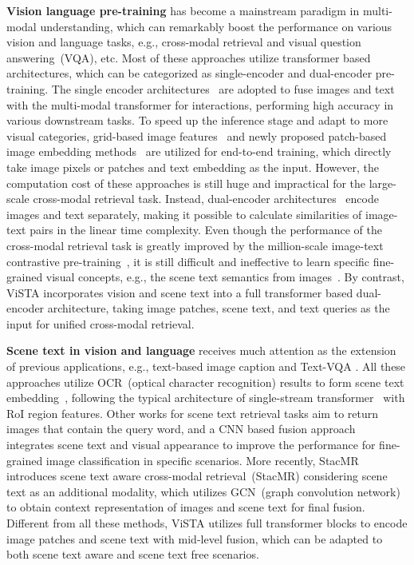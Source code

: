 \documentclass[10pt,twocolumn,letterpaper]{article}
\begin{document}
\noindent \textbf{Vision language pre-training}
has become a mainstream paradigm in multi-modal understanding, which can remarkably boost the performance on various vision and language tasks, e.g., cross-modal retrieval and visual question answering~(VQA), etc. Most of these approaches utilize transformer based architectures, which can be categorized as single-encoder and dual-encoder pre-training. The single encoder architectures~\cite{vilbert, vl-betr, imagebert, tan2019lxmert, unicoder, UNITER, oscar, ERNIE-ViL, vinvl, Pixel-BERT, SOHO, ViLT, xue2021probing} are adopted to fuse images and text with the multi-modal transformer for interactions, performing high accuracy in various downstream tasks. To speed up the inference stage and adapt to more visual categories, grid-based image features~\cite{Pixel-BERT, SOHO} and newly proposed patch-based image embedding methods~\cite{ViLT, xue2021probing, albef} are utilized for end-to-end training, which directly take image pixels or patches and text embedding as the input. However, the computation cost of these approaches is still huge and impractical for the large-scale cross-modal retrieval task. Instead, dual-encoder architectures~\cite{CLIP,ALIGN,wenlan} encode images and text separately, making it possible to calculate similarities of image-text pairs in the linear time complexity. Even though the performance of the cross-modal retrieval task is greatly improved by the million-scale image-text contrastive pre-training~\cite{CLIP}, it is still difficult and ineffective to learn specific fine-grained visual concepts, e.g., the scene text semantics from images~\cite{CLIP}. By contrast, ViSTA incorporates vision and scene text into a full transformer based dual-encoder architecture, taking image patches, scene text, and text queries as the input for unified cross-modal retrieval.


\noindent \textbf{Scene text in vision and language}
receives much attention as the extension of previous applications, e.g., text-based image caption \cite{sidorov2020textcaps,yang2021tap} and Text-VQA \cite{singh2019towards, biten2019scene,yang2021tap,Beyond_OCR_VQA,simple_is_not_easy}. All these approaches utilize OCR~(optical character recognition) results to form scene text embedding~\cite{singh2019towards, biten2019scene,yang2021tap,single_shot_st}, following the typical architecture of single-stream transformer~\cite{vilbert} with RoI region features. Other works \cite{single_shot_st}\cite{wang2021scene_CVPR21} for scene text retrieval tasks aim to return images that contain the query word, and a CNN based fusion approach~\cite{integrate_scene_text} integrates scene text and visual appearance to improve the performance for fine-grained image classification in specific scenarios. More recently, StacMR \cite{STARNet} introduces scene text aware cross-modal retrieval~(StacMR) considering scene text as an additional modality, which utilizes GCN~(graph convolution network) to obtain context representation of images and scene text for final fusion. Different from all these methods, ViSTA utilizes full transformer blocks to encode image patches and scene text with mid-level fusion, which can be adapted to both scene text aware and scene text free scenarios.
\end{document}
